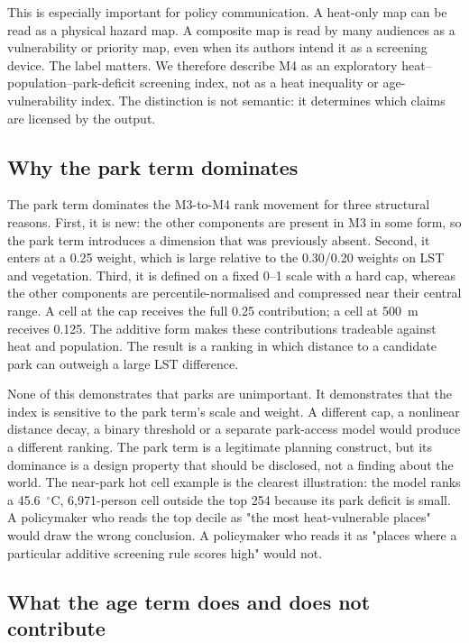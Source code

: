 \documentclass[times,twoside]{_Templates/MultiTargetManuscript}
\begin{document}
This is especially important for policy communication. A heat-only map can be
read as a physical hazard map. A composite map is read by many audiences as a
vulnerability or priority map, even when its authors intend it as a screening
device. The label matters. We therefore describe M4 as an exploratory
heat--population--park-deficit screening index, not as a heat inequality or
age-vulnerability index. The distinction is not semantic: it determines which
claims are licensed by the output.

\subsection{Why the park term dominates}

The park term dominates the M3-to-M4 rank movement for three structural reasons.
First, it is new: the other components are present in M3 in some form, so the
park term introduces a dimension that was previously absent. Second, it enters at
a 0.25 weight, which is large relative to the 0.30/0.20 weights on LST and
vegetation. Third, it is defined on a fixed 0--1 scale with a hard cap, whereas
the other components are percentile-normalised and compressed near their central
range. A cell at the cap receives the full 0.25 contribution; a cell at 500~m
receives 0.125. The additive form makes these contributions tradeable against
heat and population. The result is a ranking in which distance to a candidate
park can outweigh a large LST difference.

None of this demonstrates that parks are unimportant. It demonstrates that the
index is sensitive to the park term's scale and weight. A different cap, a
nonlinear distance decay, a binary threshold or a separate park-access model
would produce a different ranking. The park term is a legitimate planning
construct, but its dominance is a design property that should be disclosed, not
a finding about the world. The near-park hot cell example is the clearest
illustration: the model ranks a 45.6~$^\circ$C, 6,971-person cell outside the top
254 because its park deficit is small. A policymaker who reads the top decile as
"the most heat-vulnerable places" would draw the wrong conclusion. A
policymaker who reads it as "places where a particular additive screening rule
scores high" would not.

\subsection{What the age term does and does not contribute}
\end{document}
